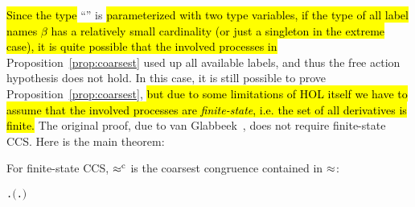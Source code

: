 \hl{Since the type} ``'' is \hl{parameterized with two
type variables, if the type of all label
names $\beta$ has a relatively small cardinality (or just a singleton in the
extreme case), it is quite possible that the involved processes in}
Proposition~\ref{prop:coarsest} used up all available labels, and thus the free
action hypothesis does not hold. In this case, it is still possible to prove
Proposition~\ref{prop:coarsest}, \hl{but due to some
limitations of HOL itself we have to assume that the involved
processes are \emph{finite-state}, i.e. the set of all derivatives is
finite.} The original proof, due to van
Glabbeek~\cite{van2005characterisation}, does not require finite-state CCS.
Here is the main theorem:
\begin{theorem}
    \label{thm:coarsestfiniteState}
    For finite-state CCS, $\mathrel{\approx^{\rm{c}}}$ is the coarsest congruence contained in $\approx$:
\begin{alltt}
\HOLTokenTurnstile{} \HOLSymConst{\HOLTokenForall{}} .   \HOLSymConst{\HOLTokenConj{}}   \HOLSymConst{\HOLTokenImp{}} \ensuremath{(} \HOLSymConst{\HOLTokenObsCongr}  \HOLSymConst{\HOLTokenEquiv{}} \HOLSymConst{\HOLTokenForall{}}.  \HOLSymConst{\ensuremath{+}}  \HOLSymConst{\HOLTokenWeakEQ}  \HOLSymConst{\ensuremath{+}} \ensuremath{)}
\end{alltt}
\end{theorem}

